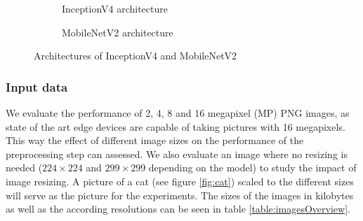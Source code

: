 \begin{figure}[!htb]
\centering
\begin{subfigure}[t]{0.47\textwidth}
   \resizebox{.99\linewidth}{!}{}
   \caption{InceptionV4 architecture \cite{InceptionV4}}
   \label{fig:inceptionv4Archi} 
\end{subfigure}%
\begin{subfigure}[t]{0.47\textwidth}
   \resizebox{.99\linewidth}{!}{}
   \caption{MobileNetV2 architecture \cite{DBLP:journals/corr/abs-1801-04381}}
   \label{fig:MobileNetArchi}
\end{subfigure}

\caption{Architectures of InceptionV4 and MobileNetV2}
\end{figure}

\subsubsection{Input data}
We evaluate the performance of 2, 4, 8 and 16  megapixel (MP) PNG images, as state of the art edge devices  are capable of taking pictures with 16 megapixels. This way the effect of different image sizes on the performance of the preprocessing step can assessed. We also evaluate an image where no resizing is needed ($224\times224$ and $299\times299$ depending on the model) to study the impact of image resizing. A picture of a cat (see figure \ref{fig:cat}) scaled to the different sizes will serve as the picture for the experiments.
The sizes of the images in kilobytes as well as the according resolutions can be seen in table \ref{table:imagesOverview}.

